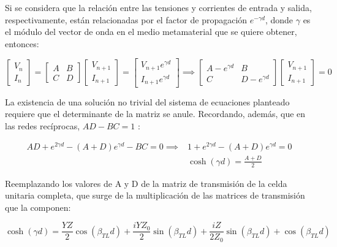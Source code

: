 Si se considera que la relación entre las tensiones y corrientes de entrada y salida, respectivamente, están relacionadas por el factor de propagación $e^{-\gamma d}$, donde $\gamma$ es el módulo del vector de onda en el medio metamaterial que se quiere obtener, entonces:

\begin{equation}
	\begin{bmatrix}
		V_n \\ I_n
	\end{bmatrix}
	=
	\begin{bmatrix}
	A & B \\
	C & D
	\end{bmatrix}
	\begin{bmatrix}
	V_{n+1} \\
	I_{n+1}
	\end{bmatrix}
	=
	\begin{bmatrix}
	V_{n+1}e^{\gamma d} \\ 
	I_{n+1}e^{\gamma d}
	\end{bmatrix}
	\implies
	\begin{bmatrix}
	A-e^{\gamma d} & B \\
	C & D-e^{\gamma d}
	\end{bmatrix}
	\begin{bmatrix}
	V_{n+1} \\ I_{n+1}
	\end{bmatrix}
	= 0
\end{equation}

La existencia de una solución no trivial del sistema de ecuaciones planteado requiere que el determinante de la matriz se anule. Recordando, además, que en las redes recíprocas, $AD-BC=1$ \cite{Pozar:MwEngineering}:

\begin{subequations}
	\begin{align}
		AD + e^{2 \gamma d} - (A+D)e^{\gamma d}-BC = 0 \implies &1+e^{2\gamma d}-(A+D)e^{\gamma d} = 0 \\
		&\cosh (\gamma d) = \frac{A+D}{2}
	\end{align}
\end{subequations}

Reemplazando los valores de A y D de la matriz de transmisión de la celda unitaria completa, que surge de la multiplicación de las matrices de transmisión que la componen:

\begin{equation}
\cosh (\gamma d) = \frac{Y Z}{2} \cos{\left (\beta_{TL} d \right )} + \frac{i Y Z_{0}}{2} \sin{\left (\beta_{TL} d \right )} + \frac{i Z}{2 Z_{0}} \sin{\left (\beta_{TL} d \right )} + \cos{\left (\beta_{TL} d \right )}
\end{equation}


